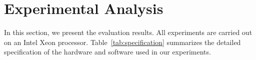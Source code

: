 \section{Experimental Analysis}
\label{sec:evaluation}
In this section, we present the evaluation results. All experiments are carried out on an Intel Xeon processor. Table~\ref{tab:specification} summarizes the detailed specification of the hardware and software used in our experiments.
\begin{table}[t]
\centering
\caption{Specification of our evaluation platform}
\label{tab:specification}
\end{table}



